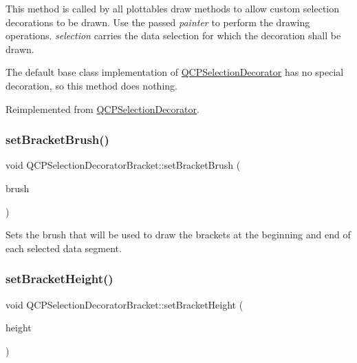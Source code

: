 This method is called by all plottables\textquotesingle{} draw methods to allow custom selection decorations to be drawn. Use the passed {\itshape painter} to perform the drawing operations. {\itshape selection} carries the data selection for which the decoration shall be drawn.

The default base class implementation of \hyperlink{class_q_c_p_selection_decorator}{Q\+C\+P\+Selection\+Decorator} has no special decoration, so this method does nothing. 

Reimplemented from \hyperlink{class_q_c_p_selection_decorator_a4f8eb49e277063845391e803ae23054a}{Q\+C\+P\+Selection\+Decorator}.

\mbox{\label{class_q_c_p_selection_decorator_bracket_a2f4ea0bfb0ea980252b76dd349dd53aa}} 
\subsubsection{\texorpdfstring{set\+Bracket\+Brush()}{setBracketBrush()}}
{\footnotesize\ttfamily void Q\+C\+P\+Selection\+Decorator\+Bracket\+::set\+Bracket\+Brush (\begin{DoxyParamCaption}\item[{const Q\+Brush \&}]{brush }\end{DoxyParamCaption})}

Sets the brush that will be used to draw the brackets at the beginning and end of each selected data segment. \mbox{\label{class_q_c_p_selection_decorator_bracket_aed773ad737201cca40efc6fe451acad8}} 
\subsubsection{\texorpdfstring{set\+Bracket\+Height()}{setBracketHeight()}}
{\footnotesize\ttfamily void Q\+C\+P\+Selection\+Decorator\+Bracket\+::set\+Bracket\+Height (\begin{DoxyParamCaption}\item[{int}]{height }\end{DoxyParamCaption})}

